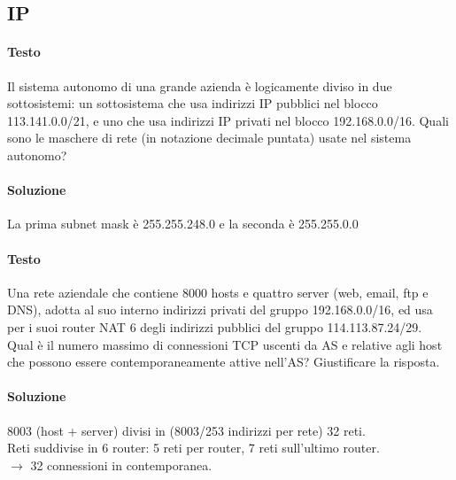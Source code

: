 \documentclass[10pt]{article}
\begin{document}
\subsection{IP}
\paragraph{Testo} Il sistema autonomo di una grande azienda è logicamente diviso in due sottosistemi: un sottosistema che usa indirizzi IP pubblici nel blocco 113.141.0.0/21, e uno che usa indirizzi IP privati nel blocco 192.168.0.0/16. Quali sono le maschere di rete (in notazione decimale puntata) usate nel sistema autonomo?
\paragraph{Soluzione} La prima subnet mask è 255.255.248.0 e la seconda è 255.255.0.0
\paragraph{Testo} Una rete aziendale che contiene 8000 hosts e quattro server (web, email, ftp e DNS), adotta al suo interno indirizzi privati del gruppo 192.168.0.0/16, ed usa per i suoi router NAT 6 degli indirizzi pubblici del gruppo 114.113.87.24/29.\\
Qual è il numero massimo di connessioni TCP uscenti da AS e relative agli host che possono essere contemporaneamente attive nell’AS? Giustificare la risposta.
\paragraph{Soluzione} 8003 (host + server) divisi in (8003/253 indirizzi per rete) 32 reti.\\
Reti suddivise in 6 router: 5 reti per router, 7 reti sull'ultimo router.\\
$\longrightarrow$ 32 connessioni in contemporanea.
\pagebreak
\end{document}
